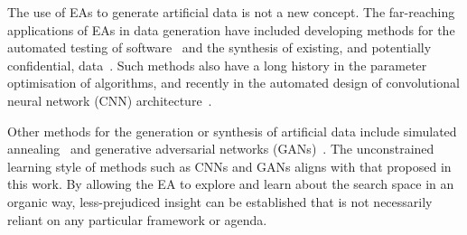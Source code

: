 
The use of EAs to generate artificial data is not a new concept. The
far-reaching applications of EAs in data generation have included developing
methods for the automated testing of
software~\cite{Koleejan2015,Michael2001,Sharifipour2018} and the synthesis of
existing, and potentially confidential, data~\cite{Chen2016}. Such methods also
have a long history in the parameter optimisation of algorithms, and recently in
the automated design of convolutional neural network (CNN)
architecture~\cite{Suganuma2017,Sun2018}.

Other methods for the generation or synthesis of artificial data include
simulated annealing~\cite{Matejka2017} and generative adversarial networks
(GANs)~\cite{Goodfellow2014}. The unconstrained learning style of methods such
as CNNs and GANs aligns with that proposed in this work. By allowing the EA to
explore and learn about the search space in an organic way, less-prejudiced
insight can be established that is not necessarily reliant on any particular
framework or agenda.
